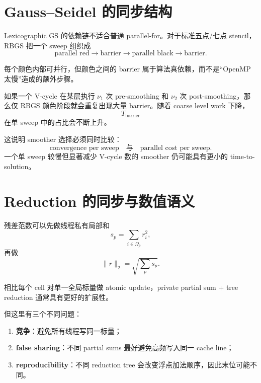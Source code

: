 \section{Gauss--Seidel 的同步结构}
\label{sec:shared-rbgs}

Lexicographic GS 的依赖链不适合普通 parallel-for。对于标准五点/七点 stencil，RBGS 把一个 sweep 组织成
\begin{equation}
\text{parallel red}
\rightarrow
\text{barrier}
\rightarrow
\text{parallel black}
\rightarrow
\text{barrier}.
\label{eq:shared-rbgs-barriers}
\end{equation}

每个颜色内部可并行，但颜色之间的 barrier 属于算法真依赖，而不是“OpenMP 太慢”造成的额外步骤。

如果一个 V-cycle 在某层执行 $\nu_1$ 次 pre-smoothing 和 $\nu_2$ 次 post-smoothing，那么仅 RBGS 颜色阶段就会重复出现大量 barrier。随着 coarse level work 下降，
\begin{equation}
T_{\mathrm{barrier}}
\end{equation}
在单 sweep 中的占比会不断上升。

这说明 smoother 选择必须同时比较：
\begin{equation}
\boxed{
\text{convergence per sweep}
\quad\text{与}\quad
\text{parallel cost per sweep}.
}
\end{equation}
一个单 sweep 较慢但显著减少 V-cycle 数的 smoother 仍可能具有更小的 time-to-solution。

\section{Reduction 的同步与数值语义}

残差范数可以先做线程私有局部和
\begin{equation}
s_p
=
\sum_{i\in\Omega_p}r_i^2,
\end{equation}
再做
\begin{equation}
\|r\|_2
=
\sqrt{\sum_p s_p}.
\end{equation}

相比每个 cell 对单一全局标量做 atomic update，private partial sum + tree reduction 通常具有更好的扩展性。

但这里有三个不同问题：

\begin{enumerate}
\item \textbf{竞争}：避免所有线程写同一标量；
\item \textbf{false sharing}：不同 partial sums 最好避免高频写入同一 cache line；
\item \textbf{reproducibility}：不同 reduction tree 会改变浮点加法顺序，因此末位可能不同。
\end{enumerate}

